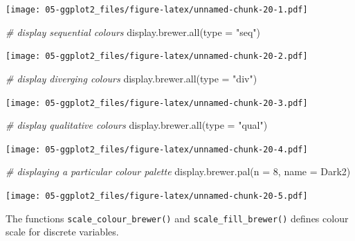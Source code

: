 \documentclass[
]{book}
\newenvironment{Shaded}{\begin{snugshade}}{\end{snugshade}}
\newcommand{\AttributeTok}[1]{\textcolor[rgb]{0.77,0.63,0.00}{#1}}
\newcommand{\CommentTok}[1]{\textcolor[rgb]{0.56,0.35,0.01}{\textit{#1}}}
\newcommand{\DecValTok}[1]{\textcolor[rgb]{0.00,0.00,0.81}{#1}}
\newcommand{\FunctionTok}[1]{\textcolor[rgb]{0.00,0.00,0.00}{#1}}
\newcommand{\NormalTok}[1]{#1}
\newcommand{\StringTok}[1]{\textcolor[rgb]{0.31,0.60,0.02}{#1}}
\begin{document}
\texttt{[image: 05-ggplot2\_files/figure-latex/unnamed-chunk-20-1.pdf]}

\begin{Shaded}
\begin{Highlighting}[]


\CommentTok{\# display sequential colours}
\FunctionTok{display.brewer.all}\NormalTok{(}\AttributeTok{type =} \StringTok{"seq"}\NormalTok{)}
\end{Highlighting}
\end{Shaded}

\texttt{[image: 05-ggplot2\_files/figure-latex/unnamed-chunk-20-2.pdf]}

\begin{Shaded}
\begin{Highlighting}[]


\CommentTok{\# display diverging colours}
\FunctionTok{display.brewer.all}\NormalTok{(}\AttributeTok{type =} \StringTok{"div"}\NormalTok{)}
\end{Highlighting}
\end{Shaded}

\texttt{[image: 05-ggplot2\_files/figure-latex/unnamed-chunk-20-3.pdf]}

\begin{Shaded}
\begin{Highlighting}[]


\CommentTok{\# display qualitative colours}
\FunctionTok{display.brewer.all}\NormalTok{(}\AttributeTok{type =} \StringTok{"qual"}\NormalTok{)}
\end{Highlighting}
\end{Shaded}

\texttt{[image: 05-ggplot2\_files/figure-latex/unnamed-chunk-20-4.pdf]}

\begin{Shaded}
\begin{Highlighting}[]


\CommentTok{\# displaying a particular colour palette}
\FunctionTok{display.brewer.pal}\NormalTok{(}\AttributeTok{n =} \DecValTok{8}\NormalTok{, }\AttributeTok{name =} \StringTok{\textquotesingle{}Dark2\textquotesingle{}}\NormalTok{)}
\end{Highlighting}
\end{Shaded}

\texttt{[image: 05-ggplot2\_files/figure-latex/unnamed-chunk-20-5.pdf]}

The functions \texttt{scale\_colour\_brewer()} and \texttt{scale\_fill\_brewer()} defines colour scale for discrete variables.
\end{document}
